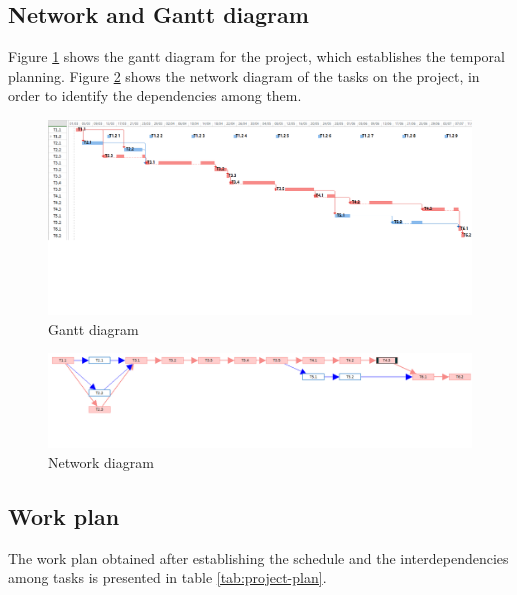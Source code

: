 \subsection*{Network and Gantt diagram}

Figure \ref{fig:gantt} shows the gantt diagram for the project, which establishes the temporal planning.
Figure \ref{fig:network-diagram} shows the network diagram of the tasks on the project, in order to identify the dependencies among them.

\begin{figure}[ht]
  \centering
  \includegraphics[angle=270,width=.6\textwidth]{fig/gantt-diagram}
  \caption{Gantt diagram}
  \label{fig:gantt}
\end{figure} 


\begin{figure}[ht]
  \centering
  \includegraphics[angle=270, width=.3\textwidth]{fig/network-diagram}
  \caption{Network diagram}
  \label{fig:network-diagram}
\end{figure} 

\subsection*{Work plan}

The work plan obtained after establishing the schedule and the interdependencies among tasks is presented in table \ref{tab:project-plan}.

